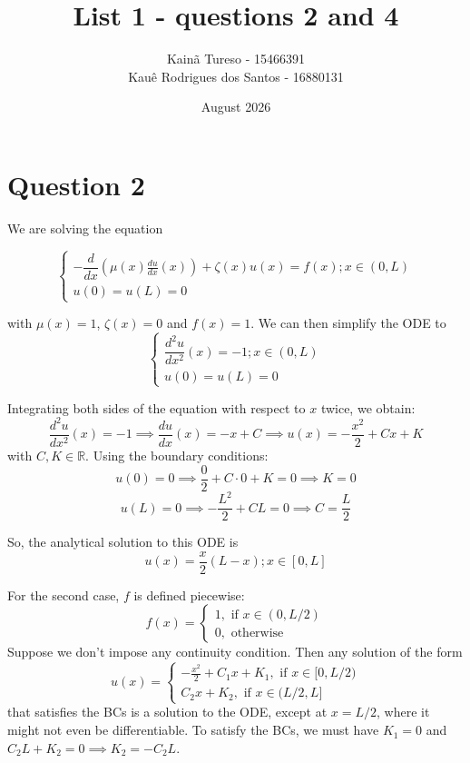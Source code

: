 \documentclass[12pt]{article}
\title{List 1 - questions 2 and 4}
\author{Kainã Tureso - 15466391 \\
        Kauê Rodrigues dos Santos - 16880131 }
\date{August 2026}
\begin{document}
\maketitle

    \section*{Question 2}

    We are solving the equation

    \begin{equation}
        \begin{cases}
            -\dfrac{d}{dx}\left( \mu(x)\frac{du}{dx}(x) \right) + \zeta(x) u(x) = f(x); x \in(0,L) \\
            u(0) = u(L) = 0
        \end{cases}
    \end{equation}

    with $\mu(x) = 1$, $\zeta(x) = 0$ and $f(x)=1$. We can then simplify the ODE to
    \begin{equation}
        \begin{cases}
            \dfrac{d^2u}{dx^2}(x) = -1; x \in (0,L) \\
            u(0) = u(L) = 0
        \end{cases}
    \end{equation}

    Integrating both sides of the equation with respect to $x$ twice, we obtain:
    \begin{equation}
        \dfrac{d^2u}{dx^2}(x) = -1 \implies \dfrac{du}{dx}(x) = -x + C \implies u(x) = -\frac{x^2}{2} + Cx + K
    \end{equation}
    with $C, K \in \mathbb{R}$. Using the boundary conditions:
    \[
        u(0) = 0 \implies \frac{0}{2} + C\cdot 0 + K = 0 \implies K =0
    \]
    \[
        u(L) = 0 \implies -\frac{L^2}{2} + CL = 0 \implies C = \frac{L}{2}
    \]

    So, the analytical solution to this ODE is
    \begin{equation}
        u(x) = \frac x 2 (L - x); x \in [0,L]
    \end{equation}

    For the second case, $f$ is defined piecewise:
    \[
        f(x) = \begin{cases}
            1, \text{ if }x \in (0,L/2) \\
            0, \text{ otherwise}
        \end{cases}
    \]
    Suppose we don't impose any continuity condition. Then any solution of the form
    \begin{equation}
        u(x) = \begin{cases}
            -\frac{x^2}{2} +C_1x + K_1, \text{ if }x \in [0,L/2) \\
            C_2x + K_2,\text{ if }x \in (L/2,L]
        \end{cases}
    \end{equation}
    that satisfies the BCs is a solution to the ODE, except at $x=L/2$, where it might not even be differentiable. To satisfy the BCs, we must have $K_1 = 0$ and $C_2L + K_2 = 0 \implies K_2 = -C_2L$.
\end{document}
